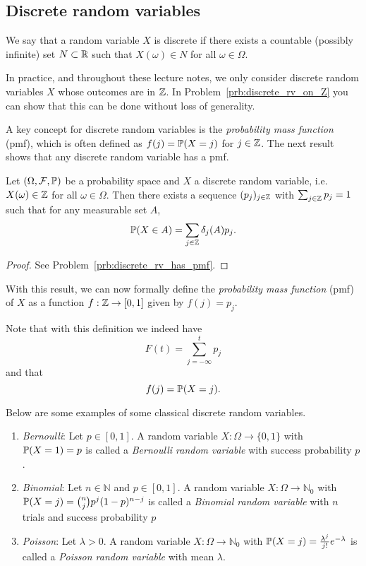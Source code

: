 \subsection{Discrete random variables}
We say that a random variable $X$ is discrete if there exists a countable (possibly infinite) set $N \subset \mathbb R$ such that $X(\omega) \in N$ for all $\omega \in \Omega$. 

In practice, and throughout these lecture notes, we only consider discrete random variables $X$ whose outcomes are in $\mathbb Z$. In Problem~\ref{prb:discrete_rv_on_Z} you can show that this can be done without loss of generality. 

A key concept for discrete random variables is the \emph{probability mass function} (pmf), which is often defined as $f(j) = \mathbb P(X = j)$ for $j \in \mathbb Z$. The next result shows that any discrete random variable has a pmf.

\begin{lemma}\label{lem:existence_pmf}
Let $(\Omega, \mathcal F, \mathbb{P})$ be a probability space and $X$ a discrete random variable, i.e. $X(\omega) \in \mathbb Z$ for all $\omega \in \Omega$. Then there exists a sequence $(p_j)_{j \in \mathbb Z}$ with $\sum_{j \in \mathbb Z} p_j = 1$ such that for any measurable set $A$,
\[
	\mathbb P(X \in A) = \sum_{j \in \mathbb Z} \delta_j(A) p_j.
\]
\end{lemma}

\begin{proof}
See Problem~\ref{prb:discrete_rv_has_pmf}.
\end{proof}

With this result, we can now formally define the \emph{probability mass function} (pmf) of $X$ as a function $f : \mathbb Z \to [0,1]$ given by $f(j) = p_j$.

Note that with this definition we indeed have
\[
	F(t) = \sum_{j = -\infty}^t p_j
\]
and that
\[
	f(j) = \mathbb P(X = j).
\]

Below are some examples of some classical discrete random variables.

\begin{example}\hfill
\begin{enumerate}[label=(\alph*)]
\item \textit{Bernoulli}: Let $p \in [0,1]$. A random variable $X : \Omega \to \{0,1\}$ with $\mathbb P(X = 1) = p$ is called a \emph{Bernoulli random variable} with success probability $p$.
\item \textit{Binomial}: Let $n \in \mathbb{N}$ and $p \in [0,1]$. A random variable $X : \Omega \to \mathbb{N}_0$ with $\mathbb P(X = j) = \binom{n}{j} p^j (1-p)^{n-j}$ is called a \emph{Binomial random variable} with $n$ trials and success probability $p$
\item \textit{Poisson}: Let $\lambda > 0$. A random variable $X : \Omega \to \mathbb{N}_0$ with $\mathbb P(X = j) = \frac{\lambda^j}{j!} e^{-\lambda}$ is called a \emph{Poisson random variable} with mean $\lambda$.
\end{enumerate}
\end{example}

